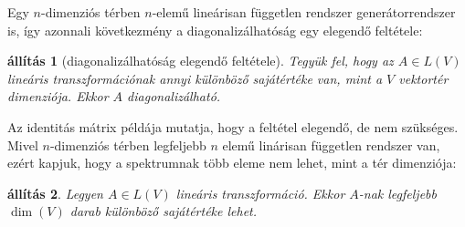 \documentclass[9pt, a4paper, showtrims]{memoir}
\theoremstyle{plain}
\newtheorem{proposition}{állítás}[chapter]
\theoremstyle{remark}
\theoremstyle{definition}
\begin{document}
Egy $n$-dimenziós térben $n$-elemű lineárisan független rendszer generátorrendszer is, így
azonnali következmény a diagonalizálhatóság egy elegendő feltétele:
\begin{proposition}[diagonalizálhatóság elegendő feltétele]
	Tegyük fel, hogy az $A\in L\left( V \right)$ lineáris transzformációnak annyi különböző sajátértéke van,
	mint a $V$ vektortér dimenziója.
	Ekkor $A$ diagonalizálható.
\end{proposition}
Az identitás mátrix példája mutatja, hogy a feltétel elegendő, de nem szükséges.
Mivel $n$-dimenziós térben legfeljebb $n$ elemű linárisan független rendszer van,
ezért kapjuk, hogy a spektrumnak több eleme nem lehet, mint a tér dimenziója:
\begin{proposition}
	Legyen $A\in L\left( V \right)$ lineáris transzformáció.
	Ekkor $A$-nak legfeljebb $\dim(V)$ darab különböző sajátértéke lehet.
\end{proposition}
\end{document}
